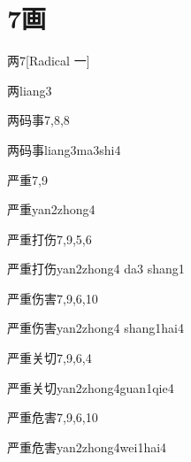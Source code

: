 
\section*{7画}

\begin{entry}{两}{7}[Radical 一]
  \begin{phonetics}{两}{liang3}
  \end{phonetics}
\end{entry}

\begin{entry}{两码事}{7,8,8}
  \begin{phonetics}{两码事}{liang3ma3shi4}
  \end{phonetics}
\end{entry}

\begin{entry}{严重}{7,9}
  \begin{phonetics}{严重}{yan2zhong4}
  \end{phonetics}
\end{entry}

\begin{entry}{严重打伤}{7,9,5,6}
  \begin{phonetics}{严重打伤}{yan2zhong4 da3 shang1}
  \end{phonetics}
\end{entry}

\begin{entry}{严重伤害}{7,9,6,10}
  \begin{phonetics}{严重伤害}{yan2zhong4 shang1hai4}
  \end{phonetics}
\end{entry}

\begin{entry}{严重关切}{7,9,6,4}
  \begin{phonetics}{严重关切}{yan2zhong4guan1qie4}
  \end{phonetics}
\end{entry}

\begin{entry}{严重危害}{7,9,6,10}
  \begin{phonetics}{严重危害}{yan2zhong4wei1hai4}
  \end{phonetics}
\end{entry}

